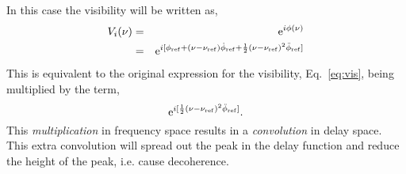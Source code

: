 \documentclass{tufte-handout}
\begin{document}
\noindent
In this case the visibility will be written as,
%
\begin{eqnarray}
\nonumber V_i(\nu) &=& {\rm e}^{i \phi(\nu)} \\
\nonumber  &=& {\rm e}^{i[\phi_{\rm ref} + (\nu - \nu_{\rm ref}) \dot{\phi}_{\rm ref} + \frac{1}{2}(\nu - \nu_{\rm ref})^2\ddot{\phi}_{\rm ref}]}
\end{eqnarray}
%
This is equivalent to the original expression for the visibility, Eq.~\ref{eq:vis}, being multiplied by the term,
%
\begin{equation}
\nonumber {\rm e}^{i[\frac{1}{2}(\nu - \nu_{\rm ref})^2\ddot{\phi}_{\rm ref}]}.
\end{equation}
%
This \emph{multiplication} in frequency space results in a \emph{convolution} in delay space. This extra convolution will spread out the peak in the delay function and reduce the height of the peak, i.e. cause decoherence.
\end{document}
